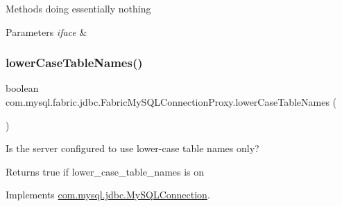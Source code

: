 Methods doing essentially nothing


\begin{DoxyParams}{Parameters}
{\em iface} & \\
\hline
\end{DoxyParams}
\mbox{\label{classcom_1_1mysql_1_1fabric_1_1jdbc_1_1_fabric_my_s_q_l_connection_proxy_a422ca39e48b5e586ff207190c6793193}} 
\subsubsection{\texorpdfstring{lower\+Case\+Table\+Names()}{lowerCaseTableNames()}}
{\footnotesize\ttfamily boolean com.\+mysql.\+fabric.\+jdbc.\+Fabric\+My\+S\+Q\+L\+Connection\+Proxy.\+lower\+Case\+Table\+Names (\begin{DoxyParamCaption}{ }\end{DoxyParamCaption})}

Is the server configured to use lower-\/case table names only?

\begin{DoxyReturn}{Returns}
true if lower\+\_\+case\+\_\+table\+\_\+names is \textquotesingle{}on\textquotesingle{} 
\end{DoxyReturn}


Implements \mbox{\hyperlink{interfacecom_1_1mysql_1_1jdbc_1_1_my_s_q_l_connection_a5b25c6fb6c56e77ebc6989179da0dd75}{com.\+mysql.\+jdbc.\+My\+S\+Q\+L\+Connection}}.

